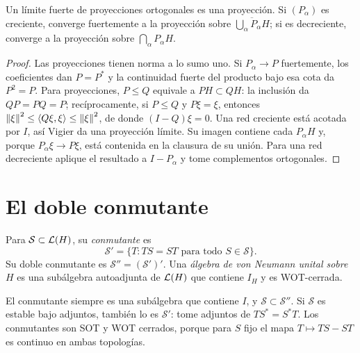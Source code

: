 \begin{proposicion}\label{v3:limites-proyecciones}
Un límite fuerte de proyecciones ortogonales es una proyección. Si $(P_\alpha)$ es creciente, converge fuertemente a la proyección sobre $\overline{\bigcup_\alpha P_\alpha H}$; si es decreciente, converge a la proyección sobre $\bigcap_\alpha P_\alpha H$.
\end{proposicion}
\begin{proof}
Las proyecciones tienen norma a lo sumo uno. Si $P_\alpha\to P$ fuertemente, los coeficientes dan $P=P^*$ y la continuidad fuerte del producto bajo esa cota da $P^2=P$. Para proyecciones, $P\le Q$ equivale a $PH\subset QH$: la inclusión da $QP=PQ=P$; recíprocamente, si $P\le Q$ y $P\xi=\xi$, entonces $\left\lVert\xi\right\rVert^2\le\left\langle Q\xi,\xi\right\rangle\le\left\lVert\xi\right\rVert^2$, de donde $(I-Q)\xi=0$. Una red creciente está acotada por $I$, así Vigier da una proyección límite. Su imagen contiene cada $P_\alpha H$ y, porque $P_\alpha\xi\to P\xi$, está contenida en la clausura de su unión. Para una red decreciente aplique el resultado a $I-P_\alpha$ y tome complementos ortogonales.
\end{proof}

\section{El doble conmutante}

\begin{definicion}
Para $\mathcal S\subset\mathcal L(H)$, su \emph{conmutante} es
\[
 \mathcal S'=\{T:TS=ST\text{ para todo }S\in\mathcal S\}.
\]
Su doble conmutante es $\mathcal S''=(\mathcal S')'$. Una \emph{álgebra de von Neumann unital sobre $H$} es una subálgebra autoadjunta de $\mathcal L(H)$ que contiene $I_H$ y es WOT-cerrada.
\end{definicion}

El conmutante siempre es una subálgebra que contiene $I$, y $\mathcal S\subset\mathcal S''$. Si $\mathcal S$ es estable bajo adjuntos, también lo es $\mathcal S'$: tome adjuntos de $TS^*=S^*T$. Los conmutantes son SOT y WOT cerrados, porque para $S$ fijo el mapa $T\mapsto TS-ST$ es continuo en ambas topologías.

